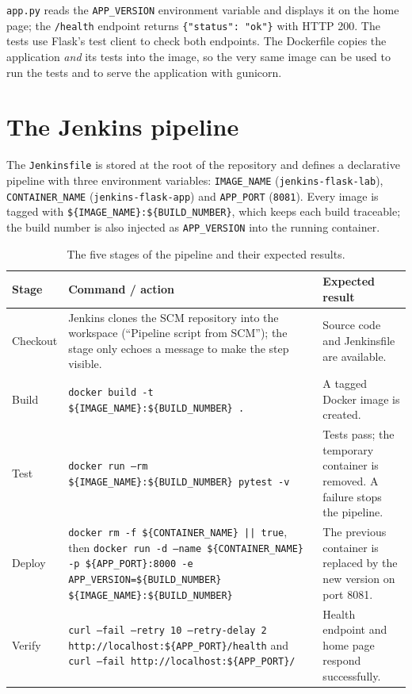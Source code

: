 \documentclass[11pt,a4paper]{article}
\begin{document}
\texttt{app.py} reads the \texttt{APP\_VERSION} environment variable and displays it on
the home page; the \texttt{/health} endpoint returns \texttt{\{"status": "ok"\}} with
HTTP 200. The tests use Flask's test client to check both endpoints. The Dockerfile
copies the application {\em and} its tests into the image, so the very same image can be
used to run the tests and to serve the application with gunicorn.

\section{The Jenkins pipeline}

The \texttt{Jenkinsfile} is stored at the root of the repository and defines a
declarative pipeline with three environment variables: \texttt{IMAGE\_NAME}
(\texttt{jenkins-flask-lab}), \texttt{CONTAINER\_NAME} (\texttt{jenkins-flask-app})
and \texttt{APP\_PORT} (\texttt{8081}). Every image is tagged with
\texttt{\$\{IMAGE\_NAME\}:\$\{BUILD\_NUMBER\}}, which keeps each build traceable;
the build number is also injected as \texttt{APP\_VERSION} into the running container.

\begin{table}[htbp]
\centering
\begin{tabular}{@{}p{}p{}p{}@{}}
\toprule
\textbf{Stage} & \textbf{Command / action} & \textbf{Expected result}\\
\midrule
Checkout & Jenkins clones the SCM repository into the workspace (``Pipeline script from SCM''); the stage only echoes a message to make the step visible. & Source code and Jenkinsfile are available.\\
Build & \texttt{docker build -t \$\{IMAGE\_NAME\}:\$\{BUILD\_NUMBER\} .} & A tagged Docker image is created.\\
Test & \texttt{docker run --rm \$\{IMAGE\_NAME\}:\$\{BUILD\_NUMBER\} pytest -v} & Tests pass; the temporary container is removed. A failure stops the pipeline.\\
Deploy & \texttt{docker rm -f \$\{CONTAINER\_NAME\} || true}, then \texttt{docker run -d --name \$\{CONTAINER\_NAME\} -p \$\{APP\_PORT\}:8000 -e APP\_VERSION=\$\{BUILD\_NUMBER\} \$\{IMAGE\_NAME\}:\$\{BUILD\_NUMBER\}} & The previous container is replaced by the new version on port 8081.\\
Verify & \texttt{curl --fail --retry 10 --retry-delay 2 http://localhost:\$\{APP\_PORT\}/health} and \texttt{curl --fail http://localhost:\$\{APP\_PORT\}/} & Health endpoint and home page respond successfully.\\
\bottomrule
\end{tabular}
\caption{The five stages of the pipeline and their expected results.}
\end{table}
\end{document}
